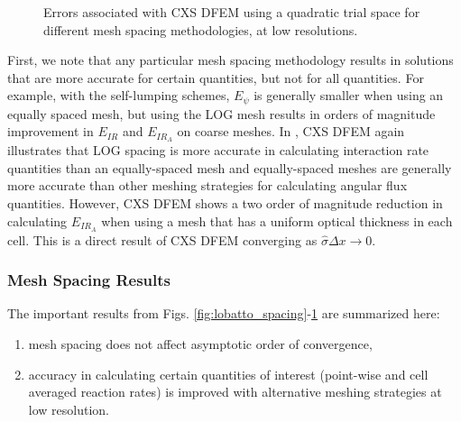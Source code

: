 \begin{figure}[!htp]
\begin{center}
{}
\end{center}
\caption{Errors associated with CXS DFEM using a quadratic trial space  for different mesh spacing methodologies, at low resolutions.}
\label{fig:low_res_cxs}
\end{figure}
First, we note that any particular mesh spacing methodology results in solutions that are more accurate for certain quantities, but not for all quantities.  
For example, with the self-lumping schemes, $E_{\psi}$ is generally smaller when using an equally spaced mesh, but using the LOG mesh results in orders of magnitude improvement in $E_{IR}$ and $E_{IR_A}$ on coarse meshes.
In , CXS DFEM again illustrates that LOG spacing is more accurate in calculating interaction rate quantities than an equally-spaced mesh and equally-spaced meshes are generally more accurate than other meshing strategies for calculating angular flux quantities.
However, CXS DFEM shows a two order of magnitude reduction in calculating $E_{IR_A}$ when using a mesh that has a uniform optical thickness in each cell.  This is a direct result of CXS DFEM converging as $\hat{\sigma} \Delta x \to 0$.


\subsubsection{Mesh Spacing Results}
\label{sec:mesh_results}
The important results from Figs. \ref{fig:lobatto_spacing}-\ref{fig:low_res_cxs} are summarized here:
\begin{enumerate}
\item mesh spacing does not affect asymptotic order of convergence,
\item accuracy in calculating certain quantities of interest (point-wise and cell averaged reaction rates) is improved with alternative meshing strategies at low resolution.
\end{enumerate}
